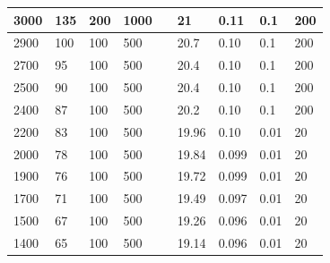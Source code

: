 \documentclass{article}
\begin{document}
\begin{longtable}[c]{|l|l|l|l|l|l|l|l|l|}
    3000          & 135                       & 200                       & 1000                       &  & 21         & 0.11                       & 0.1                        & 200                        \\ \hline
    2900          & 100                       & 100                       & 500                        &  & 20.7       & 0.10                       & 0.1                        & 200                        \\ \hline
    2700          & 95                        & 100                       & 500                        &  & 20.4       & 0.10                       & 0.1                        & 200                        \\ \hline
    2500          & 90                        & 100                       & 500                        &  & 20.4       & 0.10                       & 0.1                        & 200                        \\ \hline
    2400          & 87                        & 100                       & 500                        &  & 20.2       & 0.10                       & 0.1                        & 200                        \\ \hline
    2200          & 83                        & 100                       & 500                        &  & 19.96      & 0.10                       & 0.01                       & 20                         \\ \hline
    2000          & 78                        & 100                       & 500                        &  & 19.84      & 0.099                      & 0.01                       & 20                         \\ \hline
    1900          & 76                        & 100                       & 500                        &  & 19.72      & 0.099                      & 0.01                       & 20                         \\ \hline
    1700          & 71                        & 100                       & 500                        &  & 19.49      & 0.097                      & 0.01                       & 20                         \\ \hline
    1500          & 67                        & 100                       & 500                        &  & 19.26      & 0.096                      & 0.01                       & 20                         \\ \hline
    1400          & 65                        & 100                       & 500                        &  & 19.14      & 0.096                      & 0.01                       & 20                         \\ \hline

\end{longtable}
\end{document}
